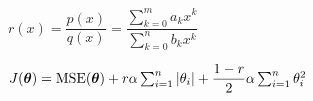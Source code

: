 \documentclass{article}
\begin{document}
\(r(x) = \dfrac{p(x)}{q(x)} = \dfrac{\sum_{k=0}^m a_k x^k}{\sum_{k=0}^n b_k
x^k}\)

\(J(\ma{\theta}) = \text{MSE}(\ma{\theta}) + r\alpha \sum_{i=1}^n|\theta_i| + 
\dfrac{1 - r}{2}\alpha \sum_{i=1}^n \theta_i^2\)
\end{document}
